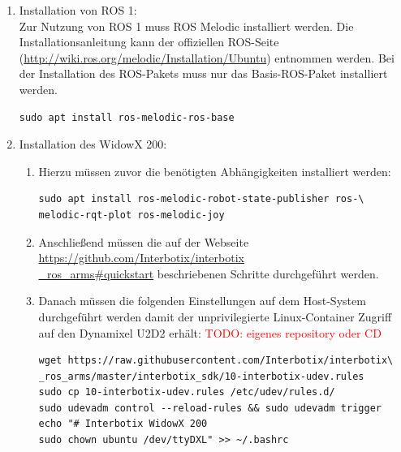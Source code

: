 \begin{enumerate}[label*=\arabic*.]
    \item Installation von ROS 1:\\
    Zur Nutzung von ROS 1 muss ROS Melodic installiert werden. Die Installationsanleitung kann der offiziellen ROS-Seite (\href{http://wiki.ros.org/melodic/Installation/Ubuntu}{http://wiki.ros.org/melodic/Installation/Ubuntu}) entnommen werden. Bei der Installation des ROS-Pakets muss nur das Basis-ROS-Paket installiert werden.

        \begin{lstlisting}[style=bash]
sudo apt install ros-melodic-ros-base
        \end{lstlisting}

    \item Installation des WidowX 200:
        \begin{enumerate}[label*=\arabic*.]
            \item Hierzu müssen zuvor die benötigten Abhängigkeiten installiert werden:

                \begin{lstlisting}[style=bash]
sudo apt install ros-melodic-robot-state-publisher ros-\
melodic-rqt-plot ros-melodic-joy
                \end{lstlisting}

            \item Anschließend müssen die auf der Webseite \href{https://github.com/Interbotix/interbotix_ros_arms#quickstart}{https://github.com/Interbotix/interbotix\\\_ros\_arms\#quickstart} beschriebenen Schritte durchgeführt werden.

            \item Danach müssen die folgenden Einstellungen auf dem Host-System durchgeführt werden damit der unprivilegierte Linux-Container Zugriff auf den Dynamixel U2D2 erhält: \textcolor{red}{\newline\newline TODO: eigenes repository oder CD\newline\newline}

                \begin{lstlisting}[style=bash]
wget https://raw.githubusercontent.com/Interbotix/interbotix\
_ros_arms/master/interbotix_sdk/10-interbotix-udev.rules
sudo cp 10-interbotix-udev.rules /etc/udev/rules.d/
sudo udevadm control --reload-rules && sudo udevadm trigger
echo "# Interbotix WidowX 200
sudo chown ubuntu /dev/ttyDXL" >> ~/.bashrc
                \end{lstlisting}


\end{enumerate}
\end{enumerate}
